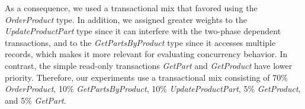 As a consequence, we used a transactional mix that favored using the \textit{OrderProduct} type. In addition, we assigned greater weights to the \textit{UpdateProductPart} type since it can interfere with the two-phase dependent transactions, and to the \textit{GetPartsByProduct} type since it accesses multiple records, which makes it more relevant for evaluating concurrency behavior. In contrast, the simple read-only transactions \textit{GetPart} and \textit{GetProduct} have lower priority. Therefore, our experiments use a transactional mix consisting of 70\% \textit{OrderProduct}, 10\% \textit{GetPartsByProduct}, 10\% \textit{UpdateProductPart}, 5\% \textit{GetProduct}, and 5\% \textit{GetPart}.